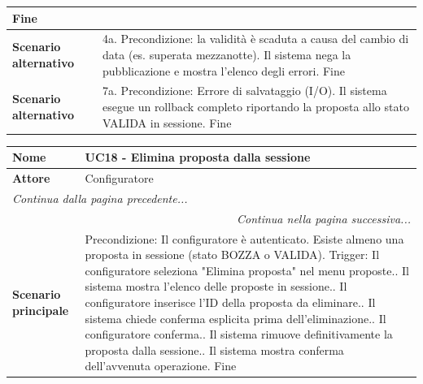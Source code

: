 \documentclass[12pt, a4paper, oneside]{report}
\begin{document}
\begin{tabularx}{\textwidth}{|l|X|}
    Fine \\ \hline
    \textbf{Scenario alternativo} & 
    4a. Precondizione: la validità è scaduta a causa del cambio di data (es. superata mezzanotte).\newline
    Il sistema nega la pubblicazione e mostra l'elenco degli errori.\newline
    Fine \\ \hline
    \textbf{Scenario alternativo} & 
    7a. Precondizione: Errore di salvataggio (I/O).\newline
    Il sistema esegue un rollback completo riportando la proposta allo stato VALIDA in sessione.\newline
    Fine \\ \hline
\end{tabularx}

\begin{tabularx}{\textwidth}{|l|X|}
    \hline
    \textbf{Nome}               & \textbf{UC18 - Elimina proposta dalla sessione} \\ \hline
    \textbf{Attore}             & Configuratore \\ \hline
    \endfirsthead 

    \hline
    \multicolumn{2}{|l|}{\textit{Continua dalla pagina precedente...}} \\ \hline
    \endhead 

    \hline
    \multicolumn{2}{|r|}{\textit{Continua nella pagina successiva...}} \\ \hline
    \endfoot 

    \hline
    \endlastfoot

    \textbf{Scenario principale} & 
    Precondizione: Il configuratore è autenticato. Esiste almeno una proposta in sessione (stato BOZZA o VALIDA).\newline
    Trigger: Il configuratore seleziona "Elimina proposta" nel menu proposte.\newline
    1. Il sistema mostra l'elenco delle proposte in sessione.\newline
    2. Il configuratore inserisce l'ID della proposta da eliminare.\newline
    3. Il sistema chiede conferma esplicita prima dell'eliminazione.\newline
    4. Il configuratore conferma.\newline
    5. Il sistema rimuove definitivamente la proposta dalla sessione.\newline
    6. Il sistema mostra conferma dell'avvenuta operazione.\newline
    Fine \\ \hline
    

\end{tabularx}
\end{document}
